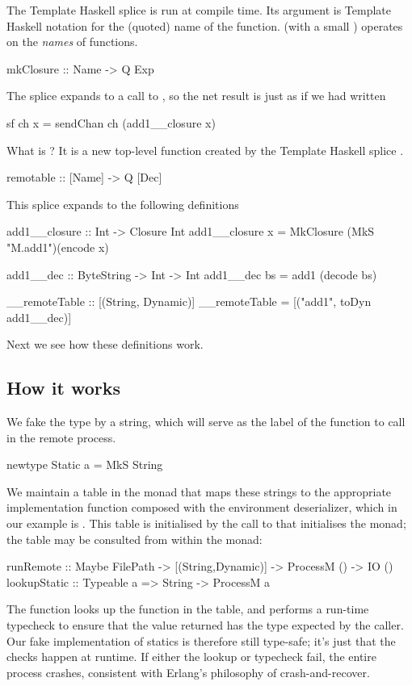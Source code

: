 \documentclass[preprint]{sigplanconf}
\begin{document}
The Template Haskell splice 
is run at compile time.  Its argument  is Template Haskell notation
for the (quoted) name of the  function.  
 (with a small ) operates on the \emph{names} of functions.
\begin{code}
  mkClosure :: Name -> Q Exp
\end{code}
The splice expands to a call to , 
so the net result is just as if we had written
\begin{code}
  sf ch x = sendChan ch (add1__closure x)
\end{code}
What is ?  It is a new top-level function
created by the Template Haskell splice .
\begin{code}
  remotable :: [Name] -> Q [Dec]
\end{code}
This splice expands to the following definitions
\begin{code}
  add1__closure :: Int -> Closure Int
  add1__closure x = MkClosure (MkS "M.add1")(encode x)

  add1__dec :: ByteString -> Int -> Int
  add1__dec bs = add1 (decode bs)

  __remoteTable :: [(String, Dynamic)]
  __remoteTable = [("add1", toDyn add1__dec)]
\end{code}
Next we see how these definitions work.

\subsection{How it works}

We fake the  type by a string, which will serve as the 
label of the function to call in the remote process.
\begin{code}
  newtype Static a = MkS String
\end{code}
We maintain a table in the  monad that maps these strings
to the appropriate implementation function composed with the environment deserializer, which in our example is
.
This table is initialised by the call to  that initialises the
 monad; the table may be consulted from within the monad:
\begin{code}
  runRemote    :: Maybe FilePath
                   -> [(String,Dynamic)]
                       -> ProcessM () -> IO ()
  lookupStatic :: Typeable a => String -> ProcessM a
\end{code}
The  function looks up the function in the table,
and performs a run-time typecheck to ensure that the value returned
has the type expected by the caller.  Our fake implementation of
statics is therefore still type-safe; it's just that the checks happen
at runtime.  If either the lookup or typecheck fail, the entire 
process crashes, consistent with Erlang's philosophy of crash-and-recover.
\end{document}

